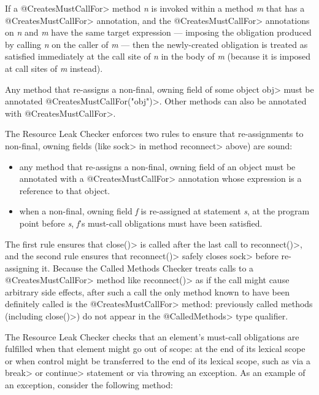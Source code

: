 If a \<@CreatesMustCallFor>
method \emph{n} is invoked within a method \emph{m} that has a \<@CreatesMustCallFor> annotation,
and the \<@CreatesMustCallFor> annotations on \emph{n} and \emph{m} have
the same target expression --- imposing the obligation produced by calling \emph{n} on the caller of \emph{m} --- then
the newly-created obligation is treated as satisfied immediately
at the call site of \emph{n} in the body of \emph{m} (because it is imposed at call sites of \emph{m}
instead).



Any method that re-assigns a non-final, owning field of some object \<obj>
must be annotated \<@CreatesMustCallFor("obj")>.
Other methods can also be annotated with \<@CreatesMustCallFor>.

The Resource Leak Checker enforces two rules to ensure that re-assignments
to non-final, owning fields (like \<sock> in method \<reconnect> above) are
sound:
\begin{itemize}
\item any method that re-assigns a non-final, owning field of an object
  must be annotated with a \<@CreatesMustCallFor> annotation
  whose expression is a reference to that object.
\item when a non-final, owning field \textit{f} is re-assigned at statement \textit{s},
  at the program point before \textit{s}, \textit{f}'s must-call obligations must have been satisfied.
\end{itemize}
\noindent
The first rule ensures that \<close()> is called after the last call
to \<reconnect()>, and the second rule ensures that \<reconnect()>
safely closes \<sock> before re-assigning it. Because the Called Methods Checker
treats calls to a \<@CreatesMustCallFor> method like \<reconnect()> as if the call might
cause arbitrary side effects, after such a call the only method known to have been
definitely called is the \<@CreatesMustCallFor> method: previously called
methods (including \<close()>) do not appear in the \<@CalledMethods> type qualifier.




The Resource Leak Checker checks that an element's must-call obligations
are fulfilled when that element might go out of scope: at the end of its
lexical scope or when control might be transferred to the end of its lexical
scope, such as via a \<break> or \<continue> statement or via throwing an
exception.  As an example of an exception, consider the following method:

